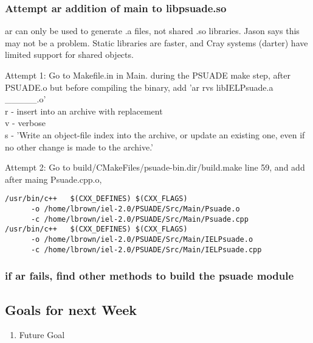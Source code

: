 \subsubsection{Attempt ar addition of main to libpsuade.so}

ar can only be used to generate .a files, not shared .so libraries. Jason says this may not be a problem. Static libraries are faster, and Cray systems (darter) have limited support for shared objects.

Attempt 1: Go to Makefile.in in Main. during the PSUADE make step, after PSUADE.o but before compiling the binary, add 'ar rvs libIELPsuade.a \_\_\_\_\_.o'	\\
r - insert into an archive with replacement		\\
v - verbose						\\
s - 'Write an object-file index into the archive, or update an existing one, even if no other change is made to the archive.'

Attempt 2: Go to build/CMakeFiles/psuade-bin.dir/build.make line 59, and add after maing Psuade.cpp.o,

	
\begin{verbatim}
/usr/bin/c++   $(CXX_DEFINES) $(CXX_FLAGS)
      -o /home/lbrown/iel-2.0/PSUADE/Src/Main/Psuade.o
      -c /home/lbrown/iel-2.0/PSUADE/Src/Main/Psuade.cpp
/usr/bin/c++   $(CXX_DEFINES) $(CXX_FLAGS)
      -o /home/lbrown/iel-2.0/PSUADE/Src/Main/IELPsuade.o 
      -c /home/lbrown/iel-2.0/PSUADE/Src/Main/IELPsuade.cpp
\end{verbatim}


\subsubsection{if ar fails, find other methods to build the psuade module}




\subsection{Goals for next Week}
\begin{enumerate}
\item Future Goal
\end{enumerate}


